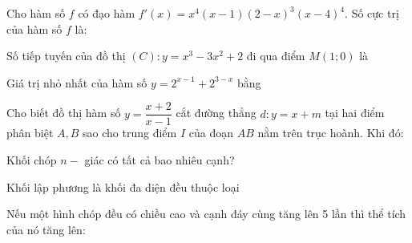 \documentclass[12pt]{article}
\begin{document}
\begin{vnmultiplechoice}[keycolumns=3]
\begin{question}%
Cho hàm số $f$ có đạo hàm $f'(x)=x^4(x-1)(2-x)^3(x-4)^4$. Số cực trị của hàm số $f$ là:
\vspace{0.2cm}
\datcot
\bonpa
{}
{}
{}
{}
\end{question}

\begin{question}%
Số tiếp tuyến của đồ thị $(C): y=x^3-3x^2+2$ đi qua điểm $M(1; 0)$ là
\vspace{0.2cm}
\datcot
\bonpa
{}
{}
{}
{}
\end{question}

\begin{question}%
Giá trị nhỏ nhất của hàm số $y=2^{x-1}+2^{3-x}$ bằng
\vspace{0.2cm}
\datcot
\bonpa
{}
{}
{}
{}
\end{question}

\begin{question}%
Cho biết đồ thị hàm số $y=\dfrac{x+2}{x-1}$ cắt đường thẳng $d: y=x+m$ tại hai điểm phân biệt $A, B$ sao cho trung điểm $I$ của đoạn $AB$ nằm trên trục hoành. Khi đó:
\vspace{0.2cm}
\datcot
\bonpa
{}
{}
{}
{}
\end{question}

\begin{question}%
Khối chóp $n-$ giác có tất cả bao nhiêu cạnh?
\vspace{0.2cm}
\datcot
\bonpa
{}
{}
{}
{}
\end{question}

\begin{question}%
Khối lập phương là khối đa diện đều thuộc loại
\vspace{0.2cm}
\datcot
\bonpa
{}
{}
{}
{}
\end{question}

\begin{question}%
Nếu một hình chóp đều có chiều cao và cạnh đáy cùng tăng lên 5 lần thì thể tích của nó tăng lên:
\vspace{0.2cm}
\datcot
\bonpa
{}
{}
{}
{}
\end{question}


\end{vnmultiplechoice}
\end{document}
